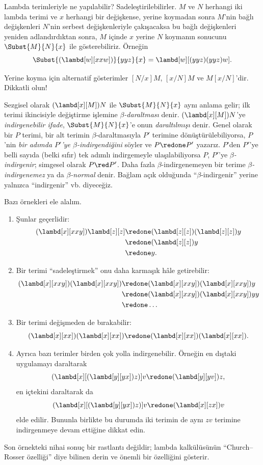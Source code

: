 \documentclass[../../../include/open-logic-section]{subfiles}
\begin{document}

Lambda terimleriyle ne yapılabilir? Sadeleştirilebilirler. $M$ ve $N$
herhangi iki lambda terimi ve $x$ herhangi bir değişkense, yerine koymadan
sonra $M$'nin bağlı değişkenleri $N$'nin serbest değişkenleriyle çakışacaksa
bu bağlı değişkenleri yeniden adlandırdıktan sonra, $M$ içinde $x$ yerine
$N$ koymanın sonucunu $\Subst{M}{N}{x}$ ile gösterebiliriz. Örneğin
\[
\Subst{(\lambd[w][xxw])}{yyz}{x} = \lambd[w][(yyz)(yyz)w].
\]

\begin{digress}
Yerine koyma için alternatif gösterimler $[N/x]M$, $[x/N]M$ ve
$M[x/N]$'dir. Dikkatli olun!
\end{digress}

Sezgisel olarak $(\lambd[x][M])N$ ile $\Subst{M}{N}{x}$ aynı anlama gelir;
ilk terimi ikincisiyle değiştirme işlemine \emph{$\beta$-daraltması} denir.
$(\lambd[x][M])N$'ye \emph{indirgenebilir ifade},
$\Subst{M}{N}{x}$'e onun \emph{daraltılmışı} denir. Genel olarak bir $P$
terimi, bir alt terimin $\beta$-daraltmasıyla $P'$ terimine
dönüştürülebiliyorsa, $P$'nin \emph{bir adımda $P'$'ye $\beta$-indirgendiğini}
söyler ve $P\redone P'$ yazarız. $P$'den $P'$'ye belli sayıda (belki sıfır)
tek adımlı indirgemeyle ulaşılabiliyorsa $P$, $P'$'ye
\emph{$\beta$-indirgenir}; simgesel olarak $P\red P'$. Daha fazla
$\beta$-indirgenemeyen bir terime \emph{$\beta$-indirgenemez} ya da
\emph{$\beta$-normal} denir. Bağlam açık olduğunda ``$\beta$-indirgenir''
yerine yalnızca ``indirgenir'' vb. diyeceğiz.

Bazı örnekleri ele alalım.
\begin{enumerate}
\item Şunlar geçerlidir:
\begin{align*}
(\lambd[x][xxy]) \lambd[z][z] & \redone (\lambd[z][z])(\lambd[z][z]) y \\
& \redone (\lambd[z][z]) y \\
& \redone y.
\end{align*}
\item Bir terimi ``sadeleştirmek'' onu daha karmaşık hâle getirebilir:
\begin{align*}
(\lambd[x][xxy])(\lambd[x][xxy]) & \redone (\lambd[x][xxy])(\lambd[x][xxy])y \\
& \redone (\lambd[x][xxy])(\lambd[x][xxy])yy \\
& \redone \dots
\end{align*}
\item Bir terimi değişmeden de bırakabilir:
\[
(\lambd[x][xx])(\lambd[x][xx]) \redone (\lambd[x][xx])(\lambd[x][xx]).
\]
\item Ayrıca bazı terimler birden çok yolla indirgenebilir. Örneğin en dıştaki
  uygulamayı daraltarak
\[
(\lambd[x][(\lambd[y][yx]) z)] v \redone (\lambd[y][yv]) z,
\]
en içtekini daraltarak da
\[
(\lambd[x][(\lambd[y][yx]) z)] v \redone (\lambd[x][zx]) v
\]
elde edilir. Bununla birlikte bu durumda iki terimin de aynı $zv$ terimine
indirgenmeye devam ettiğine dikkat edin.
\end{enumerate}

Son örnekteki nihai sonuç bir rastlantı değildir; lambda kalkülüsünün
``Church--Rosser özelliği'' diye bilinen derin ve önemli bir özelliğini
gösterir.
\end{document}
